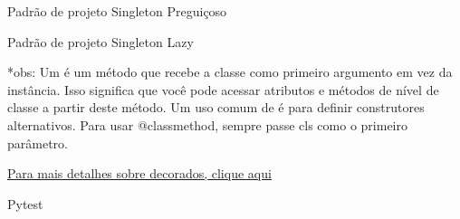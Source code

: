 \begin{frame}[t]{Padrão de projeto Singleton Preguiçoso}
	
	
	\fontsize{12pt}{15.2}\selectfont{
		Instanciação preguiçosa no padrão Singleton.
		
	}\par
	\vspace{1em}
	
	
	\fontsize{12pt}{15}\selectfont{
		\begin{itemize}%
			
			\item A instanciação preguiçosa garante que o objeto seja criado quando realmente precisamos dele.
			
			\item Considere a instanciação preguiçosa como uma maneira de trabalhar como recursos reduzidos e criá-los somente quando houver necessidade.
		\end{itemize}
	}\par
	\vspace{1em}
	
\end{frame}


\begin{frame}[t]{Padrão de projeto Singleton Lazy}
	
	
	
	*obs: Um \@classmethod é um método que recebe a classe como primeiro argumento em vez da instância. Isso significa que você pode acessar atributos e métodos de nível de classe a partir deste método. Um uso comum de \@classmethod é para definir construtores alternativos. Para usar @classmethod, sempre passe cls como o primeiro parâmetro.
	
	\href{https://peps.python.org/pep-0318/}{Para mais detalhes sobre decorados, clique aqui}
	
\end{frame}


\begin{frame}[t]{Pytest}

	\vspace{-0.5em}
	

\end{frame}

